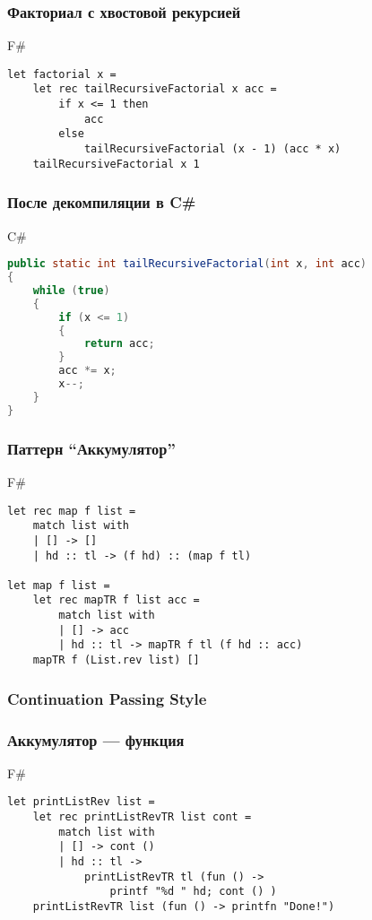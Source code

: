 \documentclass[xetex,mathserif,serif]{beamer}
\begin{document}
\begin{frame}[fragile]
	\frametitle{Факториал с хвостовой рекурсией}
	\begin{exampleblock}{F\#}
		\begin{lstlisting}
let factorial x =
    let rec tailRecursiveFactorial x acc =
        if x <= 1 then
            acc
        else
            tailRecursiveFactorial (x - 1) (acc * x)
    tailRecursiveFactorial x 1
\end{lstlisting}
\end{exampleblock}

\end{frame}
	
\begin{frame}[fragile]
	\frametitle{После декомпиляции в C\#}
		\begin{alertblock}{C\#}
			\begin{lstlisting}[language=Java]
public static int tailRecursiveFactorial(int x, int acc)
{
    while (true)
    {
        if (x <= 1)
        {
            return acc;
        }
        acc *= x;
        x--;
    }
}
\end{lstlisting}
\end{alertblock}
	
\end{frame}

\begin{frame}[fragile]
	\frametitle{Паттерн ``Аккумулятор''}
	\begin{exampleblock}{F\#}
		\begin{lstlisting}
let rec map f list =
    match list with
    | [] -> []
    | hd :: tl -> (f hd) :: (map f tl)

let map f list =
    let rec mapTR f list acc =
        match list with
        | [] -> acc
        | hd :: tl -> mapTR f tl (f hd :: acc)
    mapTR f (List.rev list) []
\end{lstlisting}
\end{exampleblock}
	
\end{frame}

\begin{frame}[fragile]
	\frametitle{Continuation Passing Style}
	\frametitle{Аккумулятор --- функция}
	\begin{exampleblock}{F\#}
		\begin{lstlisting}
let printListRev list =
    let rec printListRevTR list cont =
        match list with
        | [] -> cont ()
        | hd :: tl ->
            printListRevTR tl (fun () -> 
                printf "%d " hd; cont () )
    printListRevTR list (fun () -> printfn "Done!")
\end{lstlisting}
\end{exampleblock}
	
\end{frame}
\end{document}
